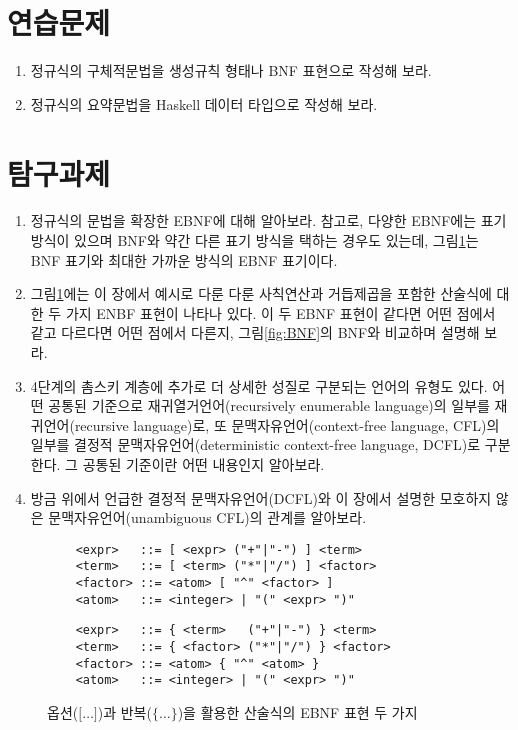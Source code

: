 \section*{연습문제}
\begin{enumerate}
 \item 정규식의 구체적문법을 생성규칙 형태나 BNF 표현으로 작성해 보라.
 \item 정규식의 요약문법을 Haskell 데이터 타입으로 작성해 보라.
\end{enumerate}

\section*{탐구과제}
\begin{enumerate}
 \item 정규식의 문법을 확장한 EBNF에 대해 알아보라.
       참고로, 다양한 EBNF에는 표기 방식이 있으며 BNF와 약간 다른
       표기 방식을 택하는 경우도 있는데, 그림\;\ref{fig:EBNF}는
       BNF 표기와 최대한 가까운 방식의 EBNF 표기이다.
 \item 그림\;\ref{fig:EBNF}에는 이 장에서 예시로 다룬 다룬 사칙연산과
       거듭제곱을 포함한 산술식에 대한 두 가지 ENBF 표현이 나타나 있다.
       이 두 EBNF 표현이 같다면 어떤 점에서 같고 다르다면 어떤 점에서
       다른지, 그림\;\ref{fig:BNF}의 BNF와 비교하며 설명해 보라.
 \item 4단계의 촘스키 계층에 추가로 더 상세한 성질로 구분되는 언어의
      유형도 있다. 어떤 공통된 기준으로 재귀열거언어(recursively
      enumerable language)의 일부를 재귀언어(recursive language)로,
      또 문맥자유언어(context-free language, CFL)의 일부를 결정적
      문맥자유언어(deterministic context-free language, DCFL)로 구분한다.
      그 공통된 기준이란 어떤 내용인지 알아보라.
 \item 방금 위에서 언급한 결정적 문맥자유언어(DCFL)와 이 장에서 설명한
       모호하지 않은 문맥자유언어(unambiguous CFL)의 관계를 알아보라.
\end{enumerate}


\begin{figure}[b]
\begin{lstlisting}
    <expr>   ::= [ <expr> ("+"|"-") ] <term>
    <term>   ::= [ <term> ("*"|"/") ] <factor>
    <factor> ::= <atom> [ "^" <factor> ]
    <atom>   ::= <integer> | "(" <expr> ")"
\end{lstlisting}

\begin{lstlisting}
    <expr>   ::= { <term>   ("+"|"-") } <term>
    <term>   ::= { <factor> ("*"|"/") } <factor>
    <factor> ::= <atom> { "^" <atom> }
    <atom>   ::= <integer> | "(" <expr> ")"
\end{lstlisting}
\caption{옵션($\texttt{[}\ldots\texttt{]}$)과
         반복($\texttt{\{}\ldots\texttt{\}}$)을
         활용한 산술식의 EBNF 표현 두 가지
         \label{fig:EBNF}}
\end{figure}



